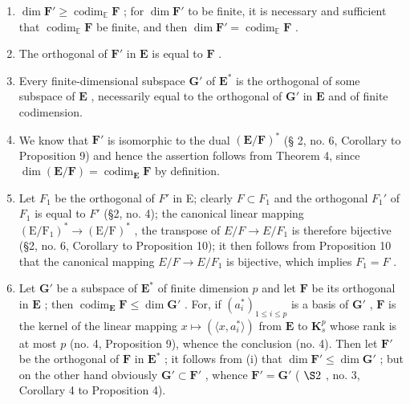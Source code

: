 \begin{enumerate}
\def\labelenumi{(\roman{enumi})}
\item
  \(\dim \mathbf{F}' \geqslant \operatorname{codim}_{\mathbb{E}} \mathbf{F}\) ; for \(\dim \mathbf{F}'\) to be finite, it is necessary and sufficient that \(\operatorname{codim}_{\mathbb{E}} \mathbf{F}\) be finite, and then \(\dim \mathbf{F}' = \operatorname{codim}_{\mathbb{E}} \mathbf{F}\) .
\item
  The orthogonal of \(\mathbf{F}'\) in \(\mathbf{E}\) is equal to \(\mathbf{F}\) .
\item
  Every finite-dimensional subspace \(\mathbf{G}'\) of \(\mathbf{E}^*\) is the orthogonal of some subspace of \(\mathbf{E}\) , necessarily equal to the orthogonal of \(\mathbf{G}'\) in \(\mathbf{E}\) and of finite codimension.
\item
  We know that \(\mathbf{F}'\) is isomorphic to the dual \((\mathbf{E} / \mathbf{F})^*\) (§ 2, no. 6, Corollary to Proposition 9) and hence the assertion follows from Theorem 4, since \(\dim (\mathbf{E} / \mathbf{F}) = \operatorname{codim}_{\mathbf{E}}\mathbf{F}\) by definition.
\item
  Let \(F_{1}\) be the orthogonal of \(F'\) in E; clearly \(F \subset F_{1}\) and the orthogonal \(F_{1}'\) of \(F_{1}\) is equal to \(F'\) (§2, no. 4); the canonical linear mapping \((\mathrm{E}/\mathrm{F}_{1})^{*} \to (\mathrm{E}/\mathrm{F})^{*}\) , the transpose of \(E/F \to E/F_{1}\) is therefore bijective (§2, no. 6, Corollary to Proposition 10); it then follows from Proposition 10 that the canonical mapping \(E/F \to E/F_{1}\) is bijective, which implies \(F_{1} = F\) .
\item
  Let \(\mathbf{G}'\) be a subspace of \(\mathbf{E}^*\) of finite dimension \(p\) and let \(\mathbf{F}\) be its orthogonal in \(\mathbf{E}\) ; then \(\operatorname{codim}_{\mathbf{E}} \mathbf{F} \leqslant \dim \mathbf{G}'\) . For, if \((a_{i}^{*})_{1 \leqslant i \leqslant p}\) is a basis of \(\mathbf{G}'\) , \(\mathbf{F}\) is the kernel of the linear mapping \(x \mapsto (\langle x, a_{i}^{*} \rangle)\) from \(\mathbf{E}\) to \(\mathbf{K}_{s}^{p}\) whose rank is at most \(p\) (no. 4, Proposition 9), whence the conclusion (no. 4). Then let \(\mathbf{F}'\) be the orthogonal of \(\mathbf{F}\) in \(\mathbf{E}^*\) ; it follows from (i) that \(\dim \mathbf{F}' \leqslant \dim \mathbf{G}'\) ; but on the other hand obviously \(\mathbf{G}' \subset \mathbf{F}'\) , whence \(\mathbf{F}' = \mathbf{G}'\) ( \(\S 2\) , no. 3, Corollary 4 to Proposition 4).
\end{enumerate}

